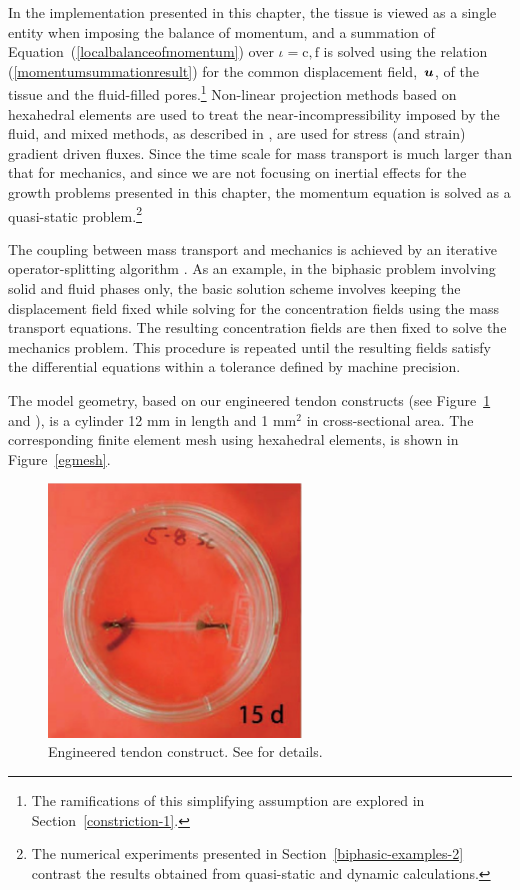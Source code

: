 In the implementation presented in this chapter, the tissue is viewed
as a single entity when imposing the balance of momentum, and a
summation of Equation~(\ref{localbalanceofmomentum}) over
$\iota=\mathrm{c,f}$ is solved using the relation
(\ref{momentumsummationresult}) for the common displacement
\mbox{field, $\mbox{\boldmath$ u$}$,} of the tissue and the fluid-filled
pores.\footnote{The ramifications of this simplifying assumption are
  explored in Section~\ref{constriction-1}.} Non-linear projection
methods \citep{simotaylorpister:85} based on hexahedral elements are
used to treat the near-incompressibility imposed by the fluid, and
mixed methods, as described in \cite{Garikipatiox2:01}, are used for
stress (and strain) gradient driven fluxes. Since the time scale for
mass transport is much larger than that for mechanics, and since we
are not focusing on inertial effects for the growth problems presented
in this chapter, the momentum equation is solved as a quasi-static
problem.\footnote{The numerical experiments presented in
  Section~\ref{biphasic-examples-2} contrast the results obtained from
  quasi-static and dynamic calculations.}

The coupling between mass transport and mechanics is achieved by an
iterative operator-splitting
algorithm \citep{Armero-poroplasticity:99,
  Garikipatietal:01}.  As an
example, in the biphasic problem involving solid and fluid phases
only, the basic solution scheme involves keeping the displacement
field fixed while solving for the concentration fields using the mass
transport equations. The resulting concentration fields are then fixed
to solve the mechanics problem. This procedure is repeated until the
resulting fields satisfy the differential equations within a
tolerance defined by machine precision.

The model geometry, based on our engineered tendon constructs (see
Figure~\ref{engconst} and \citet{Calve:04}), is a cylinder 12 mm in
length and 1 mm$^2$ in cross-sectional area. The corresponding finite
element mesh using hexahedral elements, is shown in
Figure~\ref{egmesh}.

\begin{figure}[!hpt]
\centering
  \includegraphics[width=0.6\textwidth]{images/experiments/one-construct}
\caption{Engineered tendon construct. See \citet{Calve:04} for
  details.} 
\label{engconst}
\end{figure}

